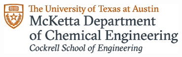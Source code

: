 \documentclass[a0paper,fleqn]{betterposter}
\begin{document}
{\vspace{1em}

\begin{center}
\includegraphics[width=0.7\textwidth,trim={0 0 0 0}]{img/Cockrell_RGB_formal_CHE}
\end{center}
}
\end{document}
